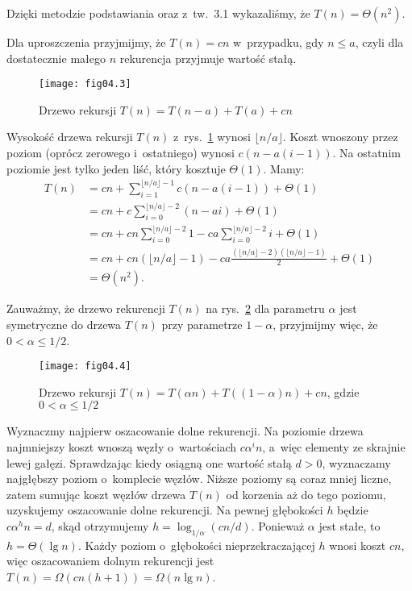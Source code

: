 Dzięki metodzie podstawiania oraz z~tw.~3.1 wykazaliśmy, że $T(n)=\Theta(n^2)$.
\medskip %

\exercise %
Dla uproszczenia przyjmijmy, że $T(n)=cn$ w~przypadku, gdy $n\le a$, czyli dla dostatecznie małego $n$ rekurencja przyjmuje wartość stałą.
\begin{figure}[ht]
	\begin{center}
		\texttt{[image: fig04.3]}
	\end{center}
	\caption{Drzewo rekursji $T(n)=T(n-a)+T(a)+cn$} \label{fig:4.2-4}
\end{figure}
Wysokość drzewa rekursji $T(n)$ z~rys.~\ref{fig:4.2-4} wynosi $\lfloor n/a\rfloor$. Koszt wnoszony przez  poziom (oprócz zerowego i~ostatniego) wynosi $c(n-a(i-1))$. Na ostatnim poziomie jest tylko jeden liść, który kosztuje $\Theta(1)$. Mamy:
\begin{align*}
	T(n) &= cn+\sum_{i=1}^{\lfloor n/a\rfloor-1}c(n-a(i-1))+\Theta(1) \\
	&= cn+c\sum_{i=0}^{\lfloor n/a\rfloor-2}(n-ai)+\Theta(1) \\
	&= cn+cn\sum_{i=0}^{\lfloor n/a\rfloor-2}1-ca\sum_{i=0}^{\lfloor n/a\rfloor-2}i+\Theta(1) \\
	&= cn+cn(\lfloor n/a\rfloor-1)-ca\frac{(\lfloor n/a\rfloor-2)(\lfloor n/a\rfloor-1)}{2}+\Theta(1) \\[2mm]
	&= \Theta(n^2).
\end{align*}

\exercise %
Zauważmy, że drzewo rekurencji $T(n)$ na rys.~\ref{fig:4.2-5} dla parametru $\alpha$ jest symetryczne do drzewa $T(n)$ przy parametrze $1-\alpha$, przyjmijmy więc, że $0<\alpha\le1/2$.
\begin{figure}[ht]
	\begin{center}
		\texttt{[image: fig04.4]}
	\end{center}
	\caption{Drzewo rekursji $T(n)=T(\alpha n)+T((1-\alpha)n)+cn$, gdzie $0<\alpha\le1/2$} \label{fig:4.2-5}
\end{figure}

Wyznaczmy najpierw oszacowanie dolne rekurencji. Na  poziomie drzewa najmniejszy koszt wnoszą węzły o~wartościach $c\alpha^in$, a~więc elementy ze skrajnie lewej gałęzi. Sprawdzając kiedy osiągną one wartość stałą $d>0$, wyznaczamy najgłębszy poziom o~komplecie węzłów. Niższe poziomy są coraz mniej liczne, zatem sumując koszt węzłów drzewa $T(n)$ od korzenia aż do tego poziomu, uzyskujemy oszacowanie dolne rekurencji. Na pewnej głębokości $h$ będzie $c\alpha^hn=d$, skąd otrzymujemy $h=\log_{1/\alpha}(cn/d)$. Ponieważ $\alpha$ jest stałe, to $h=\Theta(\lg n)$. Każdy poziom o~głębokości nieprzekraczającej $h$ wnosi koszt $cn$, więc oszacowaniem dolnym rekurencji jest $T(n)=\Omega(cn(h+1))=\Omega(n\lg n)$.

